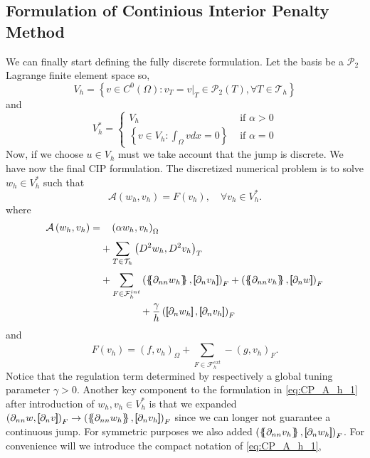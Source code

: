 \subsection{Formulation of Continious Interior Penalty Method}%
\label{sub:formulation_of_continious_interior_penalty_method}


We can finally start defining the fully discrete formulation. Let the basis be a $\mathcal{P}_{2} $ Lagrange finite element space so,
\[
V_{h} = \left\{ v \in C^{0}\left( \Omega  \right): v_{T} = v | _{T} \in \mathcal{P} _{2}\left( T \right), \forall T \in
\mathcal{T}_{h}    \right\}
\]
and
\[
V_{h}^{*} = \begin{cases}
    V_{h} & \text{ if } \alpha  > 0 \\
    \left\{ v \in V_{h}: \int_{\Omega }^{} v dx   = 0   \right\} &  \text{ if } \alpha   = 0
\end{cases}
\]
Now, if we choose $u \in V_{h}$ must we take account that the jump is discrete.
 We have now the final CIP formulation.
The discretized numerical problem is to solve $w_{h} \in V_{h}^{*}$ such that
\begin{equation}
\label{eq:CP_A_F}
\mathcal{A}\left( w_{h}, v_{h} \right)   = F\left( v_{h} \right), \quad \forall v_{h} \in V_{h}^{*}  .
\end{equation}
where
\begin{equation}
\label{eq:CP_A_h_1}
\begin{split}
\mathcal{A} \left( w_{h}, v_{h} \right)   =&
  \quad  \left( \alpha  w_{h}, v_{h} \right) _{\Omega }\\
&  + \sum_{T \in \mathcal{T} _{h}}^{} \left( D^2 w_{h}, D^2v_{h} \right) _{T} \\
 & +
  \sum_{F \in \mathcal{F}_{h}^{int} }^{}
  \left( \mean{  \partial _{n n} w_{h} }, \jump{ \partial _{n }v_{h}} \right)_{F}  +
 \left( \mean{ \partial _{n n} v_{h} }, \jump{ \partial _{n}w }      \right)_{F} \\
& \quad \quad \quad \quad  + \frac{\gamma}{h}  \left( \jump{ \partial _{n} w_{h}}, \jump{ \partial _{n} v_{h}   }   \right)_{F}
\end{split}
\end{equation}
and
\begin{equation}
\label{eq:CP_F_h}
F\left( v_{h} \right)  = \left( f, v_{h} \right) _{\Omega } +  \sum_ {F \in \mathcal{F}_{h} ^{ext}}^{} - \left(g, v_{h}  \right) _{F}.
\end{equation}
Notice that the regulation term determined by respectively a global tuning parameter $\gamma >0 $. Another key component to the formulation
in \eqref{eq:CP_A_h_1} after introduction of $ w_{h}, v_{h} \in V^{*}_{h}$  is that we expanded $\left( \partial _{nn}w, \jump{ \partial _{n} v }  \right)_{F} \to \left( \mean{ \partial _{nn}w_{h} }  , \jump{ \partial _{n} v_{h} }  \right)_{F} $ since we can longer not guarantee a
continuous jump. For symmetric purposes we also added $ \left( \mean{ \partial _{nn} v_{h}}  , \jump{ \partial _{n} w_{h} }  \right)_{F} $. For convenience will we introduce the compact notation of \eqref{eq:CP_A_h_1},

